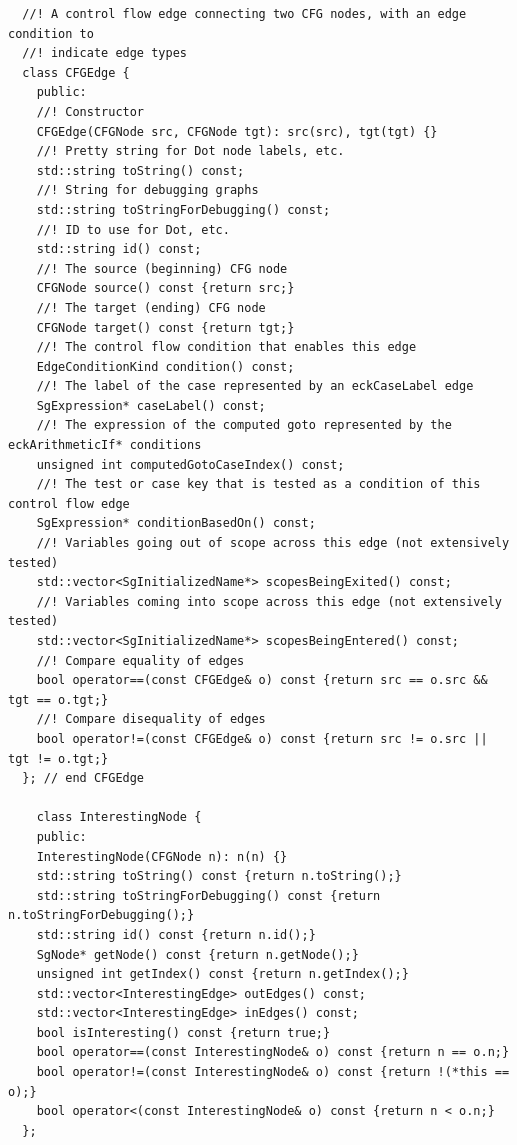 \begin{enumerate}
\begin{enumerate}
\begin{lstlisting}
  //! A control flow edge connecting two CFG nodes, with an edge condition to
  //! indicate edge types
  class CFGEdge {
    public:
    //! Constructor
    CFGEdge(CFGNode src, CFGNode tgt): src(src), tgt(tgt) {}
    //! Pretty string for Dot node labels, etc.
    std::string toString() const;
    //! String for debugging graphs
    std::string toStringForDebugging() const;
    //! ID to use for Dot, etc.
    std::string id() const;
    //! The source (beginning) CFG node
    CFGNode source() const {return src;}
    //! The target (ending) CFG node
    CFGNode target() const {return tgt;}
    //! The control flow condition that enables this edge
    EdgeConditionKind condition() const;
    //! The label of the case represented by an eckCaseLabel edge
    SgExpression* caseLabel() const;
    //! The expression of the computed goto represented by the eckArithmeticIf* conditions
    unsigned int computedGotoCaseIndex() const;
    //! The test or case key that is tested as a condition of this control flow edge
    SgExpression* conditionBasedOn() const;
    //! Variables going out of scope across this edge (not extensively tested)
    std::vector<SgInitializedName*> scopesBeingExited() const;
    //! Variables coming into scope across this edge (not extensively tested)
    std::vector<SgInitializedName*> scopesBeingEntered() const;
    //! Compare equality of edges
    bool operator==(const CFGEdge& o) const {return src == o.src && tgt == o.tgt;}
    //! Compare disequality of edges
    bool operator!=(const CFGEdge& o) const {return src != o.src || tgt != o.tgt;}
  }; // end CFGEdge

    class InterestingNode {
    public:
    InterestingNode(CFGNode n): n(n) {}
    std::string toString() const {return n.toString();}
    std::string toStringForDebugging() const {return n.toStringForDebugging();}
    std::string id() const {return n.id();}
    SgNode* getNode() const {return n.getNode();}
    unsigned int getIndex() const {return n.getIndex();}
    std::vector<InterestingEdge> outEdges() const;
    std::vector<InterestingEdge> inEdges() const;
    bool isInteresting() const {return true;}
    bool operator==(const InterestingNode& o) const {return n == o.n;}
    bool operator!=(const InterestingNode& o) const {return !(*this == o);}
    bool operator<(const InterestingNode& o) const {return n < o.n;}
  };


\end{lstlisting}
\end{enumerate}
\end{enumerate}
